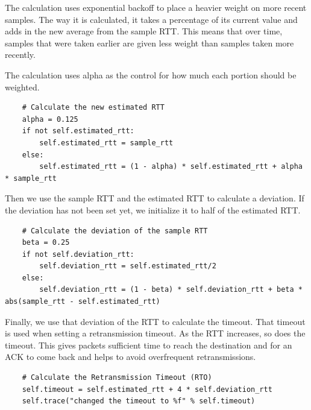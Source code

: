 \documentclass[11pt]{article}
\begin{document}
\vspace{5mm}

The calculation uses exponential backoff to place a heavier weight on more recent samples. The way it is calculated, it takes a percentage of its current value and adds in the new average from the sample RTT. This means that over time, samples that were taken earlier are given less weight than samples taken more recently.

\vspace{5mm}

The calculation uses alpha as the control for how much each portion should be weighted.

\vspace{5mm}

\begin{lstlisting}
    # Calculate the new estimated RTT
    alpha = 0.125
    if not self.estimated_rtt:
        self.estimated_rtt = sample_rtt
    else:
        self.estimated_rtt = (1 - alpha) * self.estimated_rtt + alpha * sample_rtt
\end{lstlisting}

\vspace{5mm}

Then we use the sample RTT and the estimated RTT to calculate a deviation. If the deviation has not been set yet, we initialize it to half of the estimated RTT.

\vspace{5mm}

\begin{lstlisting}
    # Calculate the deviation of the sample RTT
    beta = 0.25
    if not self.deviation_rtt:
        self.deviation_rtt = self.estimated_rtt/2
    else:
        self.deviation_rtt = (1 - beta) * self.deviation_rtt + beta * abs(sample_rtt - self.estimated_rtt)
\end{lstlisting}

\vspace{5mm}

Finally, we use that deviation of the RTT to calculate the timeout. That timeout is used when setting a retransmission timeout. As the RTT increases, so does the timeout. This gives packets sufficient time to reach the destination and for an ACK to come back and helps to avoid overfrequent retransmissions.

\vspace{5mm}

\begin{lstlisting}
    # Calculate the Retransmission Timeout (RTO)
    self.timeout = self.estimated_rtt + 4 * self.deviation_rtt
    self.trace("changed the timeout to %f" % self.timeout)
\end{lstlisting}
\end{document}
